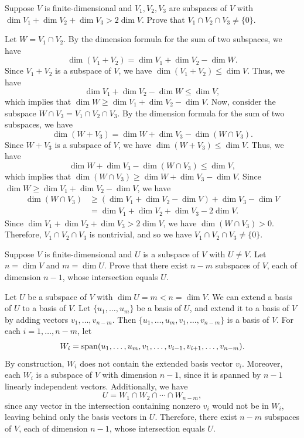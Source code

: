 \begin{exc}
\begin{exercise}
Suppose $V$ is finite-dimensional and $V_1,V_2,V_3$ are subspaces of $V$ with
$\dim V_1+\dim V_2+\dim V_3>2\dim V$. Prove that $V_1\cap V_2\cap V_3\ne\{0\}$.
\end{exercise}
\begin{solution}
Let $W=V_1\cap V_2$. By the dimension formula for the sum of two subspaces, we
have
\[ \dim(V_1+V_2) = \dim V_1+\dim V_2-\dim W. \]
Since $V_1+V_2$ is a subspace of $V$, we have $\dim(V_1+V_2)\le\dim V$. Thus, we
have
\[ \dim V_1+\dim V_2-\dim W \le \dim V, \]
which implies that $\dim W\ge\dim V_1+\dim V_2-\dim V$. Now, consider the
subspace $W\cap V_3=V_1\cap V_2\cap V_3$. By the dimension formula for the sum
of two subspaces, we have
\[ \dim(W+V_3) = \dim W+\dim V_3-\dim(W\cap V_3). \]
Since $W+V_3$ is a subspace of $V$, we have $\dim(W+V_3)\le\dim V$. Thus, we
have
\[ \dim W+\dim V_3-\dim(W\cap V_3) \le \dim V, \]
which implies that $\dim(W\cap V_3)\ge\dim W+\dim V_3-\dim V$. Since
$\dim W\ge\dim V_1+\dim V_2-\dim V$, we have
\begin{align*}
\dim(W\cap V_3) &\ge (\dim V_1+\dim V_2-\dim V)+\dim V_3-\dim V\\
  &= \dim V_1+\dim V_2+\dim V_3-2\dim V.
\end{align*}
Since $\dim V_1+\dim V_2+\dim V_3>2\dim V$, we have $\dim(W\cap V_3)>0$.
Therefore, $V_1\cap V_2\cap V_3$ is nontrivial, and so we have
$V_1\cap V_2\cap V_3\ne\{0\}$.
\end{solution}

\begin{exercise}
Suppose $V$ is finite-dimensional and $U$ is a subspace of $V$ with $U\ne V$.
Let $n=\dim V$ and $m=\dim U$. Prove that there exist $n-m$ subspaces of $V$,
each of dimension $n-1$, whose intersection equals $U$.
\end{exercise}
\begin{solution}
Let $U$ be a subspace of $V$ with $\dim U=m<n=\dim V$. We can extend a basis of
$U$ to a basis of $V$. Let $\{u_1,\dots,u_m\}$ be a basis of $U$, and extend it
to a basis of $V$ by adding vectors $v_1,\dots,v_{n-m}$. Then
$\{u_1,\dots,u_m,v_1,\dots,v_{n-m}\}$ is a basis of $V$. For each
$i=1,\dots,n-m$, let
\[ W_i = \operatorname{span}(u_1,\dots,u_m,v_1,\dots,v_{i-1},v_{i+1},\dots,v_{n-m}). \]
By construction, $W_i$ does not contain the extended basis vector $v_i$.
Moreover, each $W_i$ is a subspace of $V$ with dimension $n-1$, since it is
spanned by $n-1$ linearly independent vectors. Additionally, we have
\[ U = W_1\cap W_2\cap\cdots\cap W_{n-m}, \]
since any vector in the intersection containing nonzero $v_i$ would not be in
$W_i$, leaving behind only the basis vectors in $U$. Therefore, there exist
$n-m$ subspaces of $V$, each of dimension $n-1$, whose intersection equals $U$.
\end{solution}


\end{exc}
